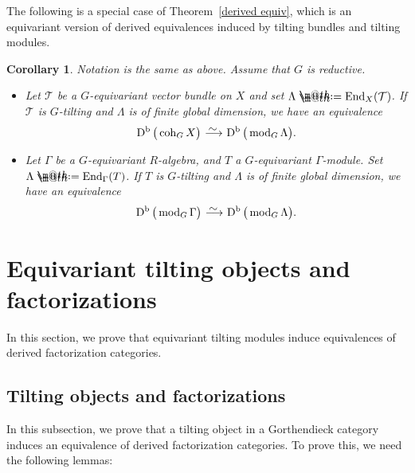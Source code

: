 \documentclass[10pt,a4paper]{amsart}
\makeatletter
\newtheorem{cor}[dfn]{Corollary}
\newcommand*{\defeq}{\mathrel{\rlap{%
 \raisebox{0.3ex}{$\m@th\cdot$}}%
 \raisebox{-0.3ex}{$\m@th\cdot$}}%
 =}
\numberwithin{equation}{section}
\newcommand{\End}{\operatorname{End}}
\newcommand{\coh}{\operatorname{coh}}
\newcommand{\fmod}{\operatorname{mod}}
\newcommand{\Db}{\operatorname{D^b}}
\newcommand{\cT}{\mathcal{T}}
\newcommand{\simto}{\,\,\,\,\raisebox{4pt}{$\sim$}{\kern -1.1em \longrightarrow}\,}
\makeatother
\begin{document}
 The following is a special case of Theorem~\ref{derived equiv}, which is an equivariant version of derived equivalences induced by tilting bundles and tilting modules.

 \begin{cor} Notation is the same as above. Assume that $G$ is reductive.
 \begin{itemize}\itemsep=0pt
 \item[$1.$] Let $\cT$ be a $G$-equivariant vector bundle on $X$ and set $\Lambda\defeq\End_X(\cT)$. If $\cT$ is $G$-tilting and $\Lambda$ is of finite global dimension, we have an equivalence
 \begin{gather*}
 \Db\big(\coh_GX\big)\simto \Db\big(\fmod_G\Lambda\big).
 \end{gather*}
 \item[$2.$] Let $\Gamma$ be a $G$-equivariant $R$-algebra, and $T$ a $G$-equivariant $\Gamma$-module. Set $\Lambda\defeq\End_{\Gamma}(T)$. If $T$ is $G$-tilting and $\Lambda$ is of finite global dimension, we have an equivalence
 \begin{gather*}
 \Db\big(\fmod_G\Gamma\big)\simto \Db\big(\fmod_G\Lambda\big).
 \end{gather*}
 \end{itemize}
\end{cor}




















\section{Equivariant tilting objects and factorizations}

In this section, we prove that equivariant tilting modules induce equivalences of derived factorization categories.

\subsection{Tilting objects and factorizations}\label{general morita}
In this subsection, we prove that a tilting object in a Gorthendieck category induces an equivalence of derived factorization categories. To prove this, we need the following lemmas:
\end{document}
